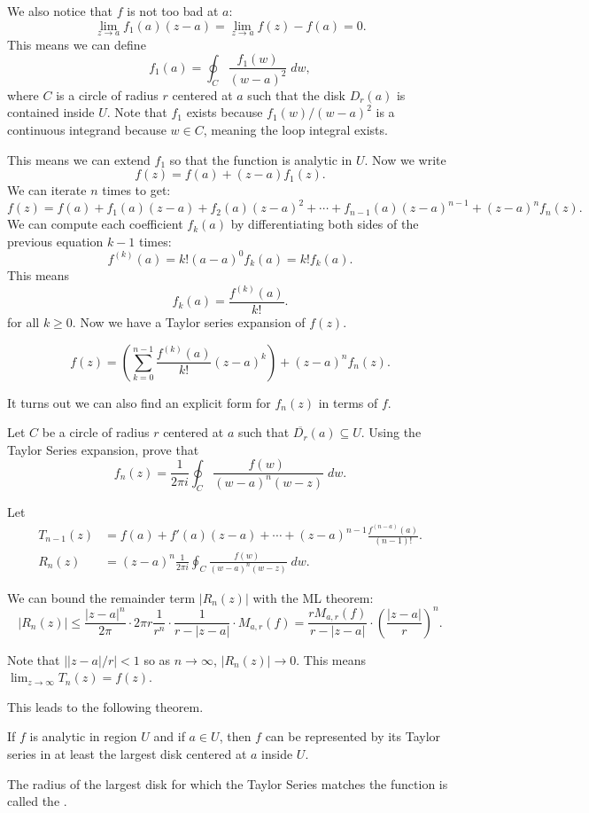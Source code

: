 We also notice that $f$ is not too bad at $a$:
\[ \lim_{z \to a} f_1(a) (z-a) = \lim_{z\to a} f(z) - f(a) = 0. \]
This means we can define 
\[ f_1(a) = \oint_C \frac{f_1(w)}{(w-a)^2} \; dw, \]
where $C$ is a circle of radius $r$ centered at $a$ such that the
disk $D_r(a)$ is contained inside $U$. 
Note that $f_1$ exists because $f_1(w)/(w-a)^2$ is a continuous
integrand because $w \in C$, meaning the loop integral exists.

This means we can extend $f_1$ so that the function is analytic
in $U$.
Now we write
\[ f(z) = f(a) + (z-a)f_1(z). \]
We can iterate $n$ times to get:
\[ f(z) = f(a) + f_1(a) (z-a) + f_2(a) (z-a)^2 + \cdots +
f_{n-1}(a)(z-a)^{n-1} + (z-a)^nf_n(z). \]
We can compute each coefficient $f_k(a)$ by differentiating both sides of the previous equation $k-1$ times:
\[f^{(k)}(a) = k!(a-a)^0f_k(a) = k!f_k(a). \]
This means
\[ f_k(a) = \frac{f^{(k)}(a)}{k!}.\]
for all $k \ge 0$.  Now we have a Taylor series expansion of $f(z)$.
\begin{theorem}
    \[ f(z) = \left( \sum_{k=0}^{n-1} \frac{f^{(k)}(a)}{k!} (z-a)^k \right) + (z-a)^nf_n(z). \]
\end{theorem}

\noindent
It turns out we can also find an explicit form for $f_n(z)$ in terms
of $f$.

\begin{exercise}
    Let $C$ be a circle of radius $r$ centered at $a$ such that
    $\overline{D_r}(a) \subseteq U$.
    Using the Taylor Series expansion, prove that
    \[ f_n(z) = \frac{1}{2\pi i} \oint_{C} \frac{f(w) \; }{(w-a)^n (w-z)}
    \; dw. \]
\end{exercise}

Let 
\begin{align*}
    T_{n-1}(z) &= f(a) + f'(a)(z-a) + \cdots + (z-a)^{n-1}
    \frac{f^{(n-a)}(a)}{(n-1)!}. \\
    R_n(z) &= (z-a)^n \frac{1}{2\pi i}\oint_C \frac{f(w) \; }{(w-a)^n (w-z)}
    \; dw.
\end{align*}

We can bound the remainder term $|R_n(z)|$ with the ML theorem:
\[ |R_n(z)| \le \frac{|z-a|^n}{2\pi}  
    \cdot 2\pi r \frac{1}{r^n} \cdot \frac{1}{r - |z-a|}
    \cdot M_{a,r}(f) = \frac{r M_{a,r}(f)}{r - |z-a|} \cdot 
\left( \frac{|z-a|}{r} \right)^n. \]

Note that $| |z-a|/r | < 1$ so as $n \to \infty$, $|R_n(z)| \to 0$.
This means $\lim_{z \to \infty} T_{n} (z) = f(z)$.

\noindent
This leads to the following theorem.
\begin{theorem}
    If $f$ is analytic in region $U$ and if $a \in U$, then $f$
    can be represented by its Taylor series in at least the largest
    disk centered at $a$ inside $U$.
\end{theorem}
The radius of the largest disk for which the Taylor Series 
matches the function is called the .

